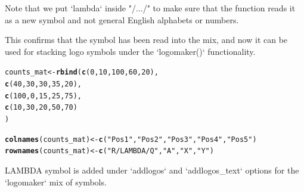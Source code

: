 \documentclass[12pt]{article}\usepackage[]{graphicx}\usepackage[usenames,dvipsnames]{color}
\makeatletter
\newcommand{\hlnum}[1]{\textcolor[rgb]{0.686,0.059,0.569}{#1}}%
\newcommand{\hlstr}[1]{\textcolor[rgb]{0.192,0.494,0.8}{#1}}%
\newcommand{\hlstd}[1]{\textcolor[rgb]{0.345,0.345,0.345}{#1}}%
\newcommand{\hlkwb}[1]{\textcolor[rgb]{0.69,0.353,0.396}{#1}}%
\newcommand{\hlkwd}[1]{\textcolor[rgb]{0.737,0.353,0.396}{\textbf{#1}}}%
\newenvironment{kframe}{%
 \def\at@end@of@kframe{}%
 \ifinner\ifhmode%
  \def\at@end@of@kframe{\end{minipage}}%
  \begin{minipage}{\columnwidth}%
 \fi\fi%
 \def\FrameCommand##1{\hskip\@totalleftmargin \hskip-\fboxsep
 \colorbox{shadecolor}{##1}\hskip-\fboxsep
     \hskip-\linewidth \hskip-\@totalleftmargin \hskip\columnwidth}%
 \MakeFramed {\advance\hsize-\width
   \@totalleftmargin\z@ \linewidth\hsize
   \@setminipage}}%
 {\par\unskip\endMakeFramed%
 \at@end@of@kframe}
\newenvironment{knitrout}{}{} %
\makeatother
\begin{document}
Note that we put `lambda` inside "/.../" to make sure that the function reads it as a new symbol and not general English alphabets or numbers.

This confirms that the symbol has been read into the mix, and now it can be used for stacking logo symbols under the `logomaker()` functionality.


\begin{knitrout}
\color{fgcolor}\begin{kframe}
\begin{alltt}
\hlstd{counts_mat} \hlkwb{<-} \hlkwd{rbind}\hlstd{(}\hlkwd{c}\hlstd{(}\hlnum{0}\hlstd{,} \hlnum{10}\hlstd{,} \hlnum{100}\hlstd{,} \hlnum{60}\hlstd{,} \hlnum{20}\hlstd{),}
                    \hlkwd{c}\hlstd{(}\hlnum{40}\hlstd{,} \hlnum{30}\hlstd{,} \hlnum{30}\hlstd{,} \hlnum{35}\hlstd{,} \hlnum{20}\hlstd{),}
                    \hlkwd{c}\hlstd{(}\hlnum{100}\hlstd{,} \hlnum{0}\hlstd{,} \hlnum{15}\hlstd{,} \hlnum{25}\hlstd{,} \hlnum{75}\hlstd{),}
                    \hlkwd{c}\hlstd{(}\hlnum{10}\hlstd{,} \hlnum{30}\hlstd{,} \hlnum{20}\hlstd{,} \hlnum{50}\hlstd{,} \hlnum{70}\hlstd{)}
\hlstd{)}

\hlkwd{colnames}\hlstd{(counts_mat)} \hlkwb{<-} \hlkwd{c}\hlstd{(}\hlstr{"Pos 1"}\hlstd{,} \hlstr{"Pos 2"}\hlstd{,} \hlstr{"Pos 3"}\hlstd{,} \hlstr{"Pos 4"}\hlstd{,} \hlstr{"Pos 5"}\hlstd{)}
\hlkwd{rownames}\hlstd{(counts_mat)} \hlkwb{<-} \hlkwd{c}\hlstd{(}\hlstr{"R/LAMBDA/Q"}\hlstd{,} \hlstr{"A"}\hlstd{,} \hlstr{"X"}\hlstd{,} \hlstr{"Y"}\hlstd{)}
\end{alltt}
\end{kframe}
\end{knitrout}

LAMBDA symbol is added under `addlogos` and `addlogos_text` options for the `logomaker` mix of symbols.
\end{document}
